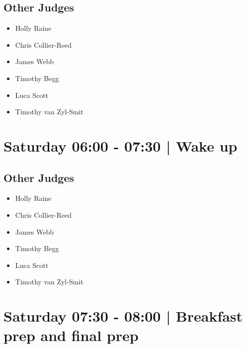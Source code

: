 \documentclass[10pt]{article}
\begin{document}
                
        \subsection*{Other Judges}
        
            \begin{itemize}
                            \item Holly Raine
                            \item Chris Collier-Reed
                            \item James Webb
                            \item Timothy Begg
                            \item Luca Scott
                            \item Timothy van Zyl-Smit
                        \end{itemize}
        

            \section*{Saturday 06:00
        -
        07:30
        |
         Wake up}
        
                
        \subsection*{Other Judges}
        
            \begin{itemize}
                            \item Holly Raine
                            \item Chris Collier-Reed
                            \item James Webb
                            \item Timothy Begg
                            \item Luca Scott
                            \item Timothy van Zyl-Smit
                        \end{itemize}
        

            \section*{Saturday 07:30
        -
        08:00
        |
         Breakfast prep and final prep}
        
                
\end{document}
